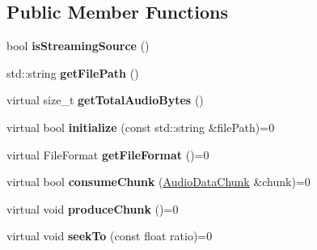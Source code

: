 \subsection*{Public Member Functions}
\begin{DoxyCompactItemize}
\item 
\mbox{\label{classexperimental_1_1AudioSourceReader_a2d4844c402277b6a4be4c6afa511d4c4}} 
bool {\bfseries is\+Streaming\+Source} ()
\item 
\mbox{\label{classexperimental_1_1AudioSourceReader_a58efe6cbeff093588bc627d313931f34}} 
std\+::string {\bfseries get\+File\+Path} ()
\item 
\mbox{\label{classexperimental_1_1AudioSourceReader_a5ecffc8877c487d1a25b3c5c1d79103b}} 
virtual size\+\_\+t {\bfseries get\+Total\+Audio\+Bytes} ()
\item 
\mbox{\label{classexperimental_1_1AudioSourceReader_ac366f901eb0b2b1ab787d91ecf46fa95}} 
virtual bool {\bfseries initialize} (const std\+::string \&file\+Path)=0
\item 
\mbox{\label{classexperimental_1_1AudioSourceReader_a2a4c4f96f85b6de2c1ecdb3dde665336}} 
virtual File\+Format {\bfseries get\+File\+Format} ()=0
\item 
\mbox{\label{classexperimental_1_1AudioSourceReader_aa49d37bf7270cd32a8ee304e096defb9}} 
virtual bool {\bfseries consume\+Chunk} (\hyperlink{structexperimental_1_1AudioDataChunk}{Audio\+Data\+Chunk} \&chunk)=0
\item 
\mbox{\label{classexperimental_1_1AudioSourceReader_a96ccb23806da052c9362a37792d7f68f}} 
virtual void {\bfseries produce\+Chunk} ()=0
\item 
\mbox{\label{classexperimental_1_1AudioSourceReader_a5d87e5d81c458e5284f1708b99628941}} 
virtual void {\bfseries seek\+To} (const float ratio)=0
\item 
\mbox{\label{classexperimental_1_1AudioSourceReader_a373f99993ef8fd44f3fd8c4347350c2d}} 

\end{DoxyCompactItemize}
